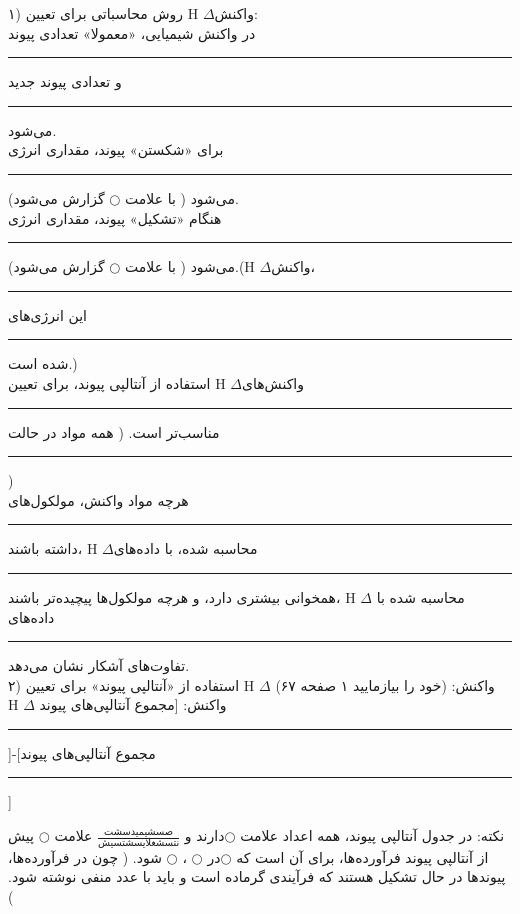 \documentclass[a4paper,12pt]{article}
\newcommand{\ff}{\rule{1cm}{0.15mm}\;}
\newcommand{\fb}{\rule{2cm}{0.15mm}\;}
\begin{document}
۱) روش محاسباتی برای تعیین H $\Delta$واکنش:
\\
در واکنش شیمیایی، «معمولا» تعدادی پیوند \ff و تعدادی پیوند جدید \ff می‌شود.
\\
برای «شکستن» پیوند،‌ مقداری انرژی \ff می‌شود ( با علامت $\bigcirc$ گزارش می‌شود).
\\
هنگام «تشکیل» پیوند،‌ مقداری انرژی \ff می‌شود ( با علامت $\bigcirc$ گزارش می‌شود).(H $\Delta$واکنش، \ff این انرژی‌های \ff شده است.)
\\
استفاده از آنتالپی پیوند، برای تعیین H $\Delta$واکنش‌های \ff مناسب‌تر است. ( همه مواد در حالت \ff )
\\
هرچه مواد واکنش‌، مولکول‌های \ff داشته باشند، H $\Delta$محاسبه شده، با داده‌های \ff همخوانی بیشتری دارد، و هرچه مولکول‌ها پیچیده‌تر باشند، H $\Delta$ محاسبه شده با داده‌های \ff تفاوت‌های آشکار نشان می‌دهد.
\\
۲) استفاده از «آنتالپی پیوند» برای تعیین H $\Delta$ واکنش: (خود را بیازمایید ۱ صفحه ۶۷)
\\
H $\Delta$ واکنش: [مجموع آنتالپی‌های پیوند\fb]-[مجموع آنتالپی‌های پیوند\fb]

\newpage

نکته: در جدول آنتالپی پیوند، همه اعداد علامت 	$\bigcirc$دارند و $\frac{\text{صسشیمیدسشت}}{\text{نتسشغلایسشتسیش}}$ علامت $\bigcirc$	پیش از آنتالپی پیوند فرآورده‌ها، برای آن است که 	$\bigcirc$در $\bigcirc$	، $\bigcirc$	شود. ( چون در فرآورده‌ها، پیوند‌ها در حال تشکیل هستند که فرآیندی گرماده است و باید با عدد منفی نوشته شود. )
\end{document}
